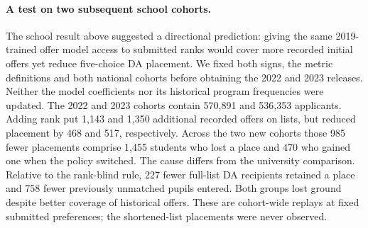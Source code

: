 \paragraph{A test on two subsequent school cohorts.}
The school result above suggested a directional prediction: giving the same 2019-trained offer model access to submitted ranks would cover more recorded initial offers yet reduce five-choice DA placement. We fixed both signs, the metric definitions and both national cohorts before obtaining the 2022 and 2023 releases. Neither the model coefficients nor its historical program frequencies were updated. The 2022 and 2023 cohorts contain 570,891 and 536,353 applicants. Adding rank put 1,143 and 1,350 additional recorded offers on lists, but reduced placement by 468 and 517, respectively. Across the two new cohorts those 985 fewer placements comprise 1,455 students who lost a place and 470 who gained one when the policy switched. The cause differs from the university comparison. Relative to the rank-blind rule, 227 fewer full-list DA recipients retained a place and 758 fewer previously unmatched pupils entered. Both groups lost ground despite better coverage of historical offers. These are cohort-wide replays at fixed submitted preferences; the shortened-list placements were never observed.
